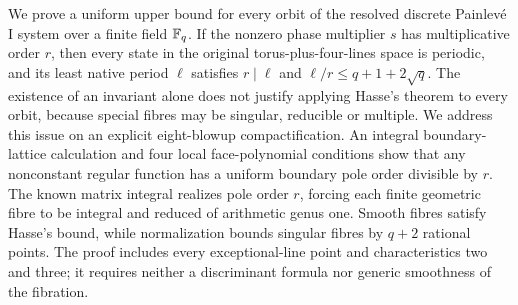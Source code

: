 We prove a uniform upper bound for every orbit of the resolved discrete
Painlev\'e I system over a finite field \(\mathbb F_q\). If the nonzero phase
multiplier \(s\) has multiplicative order \(r\), then every state in
the original torus-plus-four-lines space is periodic, and its least
native period \(\ell\) satisfies
\(r\mid\ell\) and \(\ell/r\le q+1+2\sqrt q\).
The existence of an invariant alone does not justify applying Hasse's
theorem to every orbit, because special fibres may be singular,
reducible or multiple. We address this issue on an explicit eight-blowup
compactification. An integral boundary-lattice calculation and four
local face-polynomial conditions show that any nonconstant regular
function has a uniform boundary pole order divisible by \(r\).
The known matrix integral realizes pole order \(r\), forcing each
finite geometric fibre to be integral and reduced of arithmetic genus
one. Smooth fibres satisfy Hasse's bound, while normalization bounds
singular fibres by \(q+2\) rational points. The proof includes every
exceptional-line point and characteristics two and three; it requires
neither a discriminant formula nor generic smoothness of the fibration.
